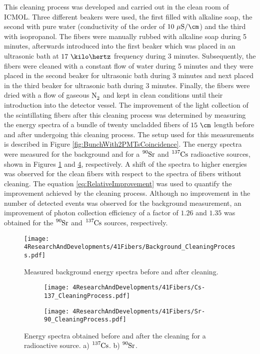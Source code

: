 This cleaning process  was developed and carried out in the clean room of ICMOL. Three different beakers were used, the first filled with alkaline soap, the second with pure water (conductivity of the order of $10~\mu\text{S}/\cm$) and the third with isopropanol. The fibers were manually rubbed with alkaline soap during 5 minutes, afterwards introduced into the first beaker which was placed in an ultrasonic bath at $17~\kilo\hertz$ frequency during 3 minutes. Subsequently, the fibers were cleaned with a constant flow of water during 5 minutes and they were placed in the second beaker for ultrasonic bath during 3 minutes and next placed in the third beaker for ultrasonic bath during 3 minutes. Finally, the fibers were dried with a flow of gaseous $\ce{N_2}$ and kept in clean conditions until their introduction into the detector vessel. The improvement of the light collection of the scintillating fibers after this cleaning process was determined by measuring the energy spectra of a bundle of twenty uncladded fibers of $15~\cm$ length before and after undergoing this cleaning process. The setup used for this measurements is described in Figure \ref{fig:BunchWith2PMTsCoincidence}. The energy spectra were measured for the background and for a $\ce{^{90}Sr}$ and $\ce{^{137}Cs}$ radioactive sources, shown in Figures \ref{fig:ResultsOfCleaningProcessBackground} and \ref{fig:ResultsOfCleaningProcessSource}, respectively. A shift of the spectra to higher energies was observed for the clean fibers with respect to the spectra of fibers without cleaning. The equation \ref{eq:RelativeImprovement} was used to quantify the improvement achieved by the cleaning process. Although no improvement in the number of detected events was observed for the background measurement, an improvement of photon collection efficiency of a factor of $1.26$ and $1.35$ was obtained for the $\ce{^{90}Sr}$ and $\ce{^{137}Cs}$ sources, respectively.

\begin{figure}[h]
\centering
\texttt{[image: 4ResearchAndDevelopments/41Fibers/Background\_CleaningProcess.pdf]}
\caption{Measured background energy spectra before and after cleaning.\label{fig:ResultsOfCleaningProcessBackground}}
\end{figure}

\begin{figure}
\centering
    \begin{subfigure}[b]{1\textwidth}
    \centering
    \texttt{[image: 4ResearchAndDevelopments/41Fibers/Cs-137\_CleaningProcess.pdf]}  
    \caption{\label{subfig:EnergySpectrumCo60CleaningTest}}
    \end{subfigure}
    \hfill
    \begin{subfigure}[b]{1\textwidth}
    \centering
    \texttt{[image: 4ResearchAndDevelopments/41Fibers/Sr-90\_CleaningProcess.pdf]}  
    \caption{\label{subfig:EnergySpectrumSr90CleaningTest}}
    \end{subfigure}
 \caption{Energy spectra obtained before and after the cleaning for a radioactive source. a) $\ce{^{137}Cs}$. b) $\ce{^{90}Sr}$.}
 \label{fig:ResultsOfCleaningProcessSource}
\end{figure}


